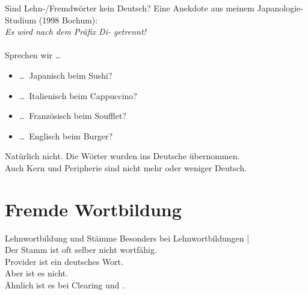 \begin{frame}
  {Sind Lehn-\slash Fremdwörter kein Deutsch?}
  \onslide<+->
  \onslide<+->
  Eine Anekdote aus meinem Japanologie-Studium (1998 Bochum):\\
  \textit{ Es wird nach dem Präfix Di- getrennt!}\\
  \onslide<+->
  \Halbzeile
   \\
  \onslide<+->
  \Zeile
  Sprechen wir \ldots
  \begin{itemize}[<+->]
    \item \ldots\ Japanisch beim \alert{Sushi}?
    \item \ldots\ Italienisch beim \alert{Cappuccino}?
    \item \ldots\ Französisch beim \alert{Soufflet}?
    \item \ldots\ Englisch beim \alert{Burger}?
  \end{itemize}
  \Halbzeile
  \onslide<+->
  Natürlich nicht. Die Wörter wurden \alert{ins Deutsche übernommen}.\\
  \Viertelzeile
  Auch \alert{Kern und Peripherie} sind nicht mehr oder weniger Deutsch.
\end{frame}

\section{Fremde Wortbildung}

\begin{frame}
  {Lehnwortbildung und Stämme}
  \onslide<+->
  \onslide<+->
  Besonders bei Lehnwortbildungen |\\
  \Viertelzeile
  Der \alert{Stamm} ist oft selber \alert{nicht wortfähig}.\\
  \Zeile
  \onslide<+->
  \alert{Provider} ist ein deutsches Wort.\\
  \onslide<+->
  Aber  ist es nicht.\\
  \Halbzeile 
  \onslide<+->
  Ähnlich ist es bei \alert{Clearing} und .\\
  \onslide<+->
  \Zeile
\end{frame}

